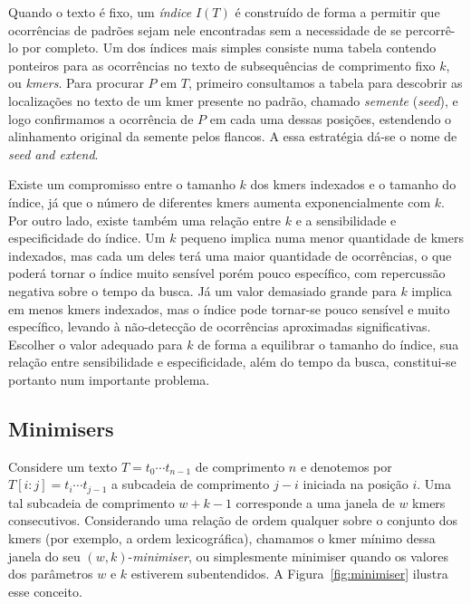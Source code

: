 \documentclass[12pt, a4paper, oneside]{article}
\begin{document}
Quando o texto é fixo, um \emph{índice} $I(T)$ é construído de forma a permitir que ocorrências de padrões sejam nele encontradas sem a necessidade de se percorrê-lo por completo. Um dos índices mais simples consiste numa tabela contendo ponteiros para as ocorrências no texto de subsequências de comprimento fixo $k$, ou \emph{kmers}. Para procurar $P$ em $T$, primeiro consultamos a tabela para descobrir as localizações no texto de um kmer presente no padrão, chamado \emph{semente} (\emph{seed}), e logo confirmamos a ocorrência de $P$ em cada uma dessas posições, estendendo o alinhamento original da semente pelos flancos. A essa estratégia dá-se o nome de \emph{seed and extend}. 

Existe um compromisso entre o tamanho $k$ dos kmers indexados e o tamanho do índice, já que o número de diferentes kmers aumenta exponencialmente com $k$. Por outro lado, existe também uma relação entre $k$ e a sensibilidade e especificidade do índice. Um $k$ pequeno implica numa menor quantidade de kmers indexados, mas cada um deles terá uma maior quantidade de ocorrências, o que poderá tornar o índice muito sensível porém pouco específico, com repercussão negativa sobre o tempo da busca. Já um valor demasiado grande para $k$ implica em menos kmers indexados, mas o índice pode tornar-se pouco sensível e muito específico, levando à não-detecção de ocorrências aproximadas significativas. Escolher o valor adequado para $k$ de forma a equilibrar o tamanho do índice, sua relação entre sensibilidade e especificidade, além do tempo da busca, constitui-se portanto num importante problema.

\subsection*{Minimisers}

Considere um texto $T=t_0\cdots t_{n-1}$ de comprimento $n$ e denotemos por $T[i:j]=t_i\cdots t_{j-1}$ a subcadeia de comprimento $j-i$\/ iniciada na posição $i$. Uma tal subcadeia de comprimento $w+k-1$ corresponde a uma janela de $w$\/ kmers consecutivos. Considerando uma relação de ordem qualquer sobre o conjunto dos kmers (por exemplo, a ordem lexicográfica), chamamos o kmer mínimo dessa janela do seu $(w,k)$-\textit{minimiser}, ou simplesmente minimiser quando os valores dos parâmetros $w$ e $k$ estiverem subentendidos. A Figura~\ref{fig:minimiser} ilustra esse conceito.
\end{document}
